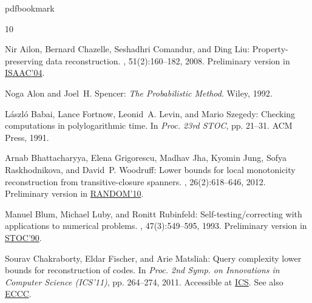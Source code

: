 %
%
%
%
%
\providecommand{\bibhead}[1]{}
%
\expandafter\ifx\csname pdfbookmark\endcsname\relax%
  \providecommand{\tocrefpdfbookmark}{}
\else\providecommand{\tocrefpdfbookmark}{%
   \hypertarget{tocreferences}{}%
   \pdfbookmark[1]{References}{tocreferences}}%
\fi

\tocrefpdfbookmark
\begin{thebibliography}{10}

\bibhead{datarecon}
{\sc Nir Ailon, Bernard Chazelle, Seshadhri Comandur, and Ding Liu}:
  Property-preserving data reconstruction.
, 51(2):160--182, 2008.
\newblock Preliminary version in
  \href{http://dx.doi.org/10.1007/978-3-540-30551-4_4}{ISAAC'04}.
\newblock [\epfmtdoi{10.1007/s00453-007-9075-9}]

\bibhead{alon}
{\sc Noga Alon and Joel~H. Spencer}: {\em The Probabilistic Method}.
\newblock Wiley, 1992.

\bibhead{bfls}
{\sc L{\'a}szl{\'o} Babai, Lance Fortnow, Leonid~A. Levin, and Mario Szegedy}:
  Checking computations in polylogarithmic time.
\newblock In {\em Proc. 23rd STOC}, pp. 21--31. ACM Press, 1991.
\newblock [\epfmtdoi{10.1145/103418.103428}]

\bibhead{lb_recon}
{\sc Arnab Bhattacharyya, Elena Grigorescu, Madhav Jha, Kyomin Jung, Sofya
  Raskhodnikova, and David~P. Woodruff}: Lower bounds for local monotonicity
  reconstruction from transitive-closure spanners.
, 26(2):618--646, 2012.
\newblock Preliminary version in
  \href{http://dx.doi.org/10.1007/978-3-642-15369-3_34}{RANDOM'10}.
\newblock [\epfmtdoi{10.1137/100808186}]

\bibhead{blr}
{\sc Manuel Blum, Michael Luby, and Ronitt Rubinfeld}: Self-testing/correcting
  with applications to numerical problems.
, 47(3):549--595, 1993.
\newblock Preliminary version in
  \href{http://dx.doi.org/10.1145/100216.100225}{STOC'90}.
\newblock [\epfmtdoi{10.1016/0022-0000(93)90044-W}]

\bibhead{thispaper}
{\sc Sourav Chakraborty, Eldar Fischer, and Arie Matsliah}: Query complexity
  lower bounds for reconstruction of codes.
\newblock In {\em Proc. 2nd Symp. on Innovations in Computer Science (ICS'11)},
  pp. 264--274, 2011.
\newblock Accessible at
  \href{http://conference.itcs.tsinghua.edu.cn/ICS2011/content/papers/1.html}{ICS}.
  See also \href{http://eccc.hpi-web.de/report/2010/067}{ECCC}.


\end{thebibliography}
